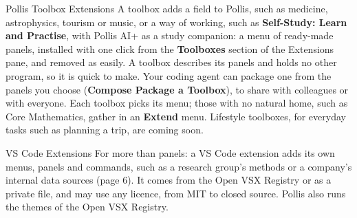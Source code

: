 \documentclass[10pt,a4paper]{article}
\begin{document}
\begin{minipage}[t]{0.485\linewidth}\vspace{0pt}
\begin{pbox}[equal height group=p7ext]{Pollis Toolbox Extensions}
A toolbox adds a field to Pollis, such as medicine, astrophysics, tourism or music, or a way of
working, such as \textbf{Self-Study: Learn and Practise}, with Pollis AI+ as a study companion: a menu of ready-made panels, installed with one click from the
\textbf{Toolboxes} section of the Extensions pane, and removed as easily. A toolbox describes its panels
and holds no other program, so it is quick to make. Your coding agent can package one from the panels
you choose (\textbf{Compose \textrightarrow{} Package a Toolbox}), to share with
colleagues or with everyone. Each toolbox picks its menu; those with no natural home, such as
Core Mathematics, gather in an \textbf{Extend} menu. Lifestyle toolboxes, for everyday tasks such as
planning a trip, are coming soon.
\end{pbox}
\end{minipage}\hfill
\begin{minipage}[t]{0.485\linewidth}\vspace{0pt}
\begin{pbox}[equal height group=p7ext]{VS Code Extensions}
For more than panels: a VS Code extension adds its own menus, panels and commands, such as a
research group's methods or a company's internal data sources (page 6). It comes from the Open VSX
Registry or as a private file, and may use any licence, from MIT to closed source. Pollis also runs
the themes of the Open VSX Registry.
\end{pbox}
\end{minipage}
\end{document}
